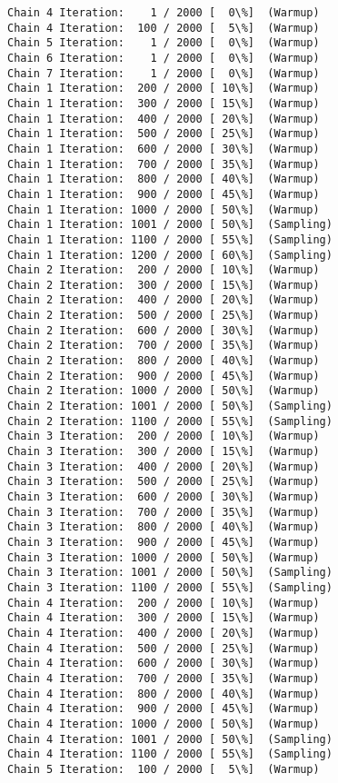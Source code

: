 \documentclass[11pt]{article}
\begin{document}
    \begin{Verbatim}[commandchars=\\\{\}]
Chain 4 Iteration:    1 / 2000 [  0\%]  (Warmup)
Chain 4 Iteration:  100 / 2000 [  5\%]  (Warmup)
Chain 5 Iteration:    1 / 2000 [  0\%]  (Warmup)
Chain 6 Iteration:    1 / 2000 [  0\%]  (Warmup)
Chain 7 Iteration:    1 / 2000 [  0\%]  (Warmup)
Chain 1 Iteration:  200 / 2000 [ 10\%]  (Warmup)
Chain 1 Iteration:  300 / 2000 [ 15\%]  (Warmup)
Chain 1 Iteration:  400 / 2000 [ 20\%]  (Warmup)
Chain 1 Iteration:  500 / 2000 [ 25\%]  (Warmup)
Chain 1 Iteration:  600 / 2000 [ 30\%]  (Warmup)
Chain 1 Iteration:  700 / 2000 [ 35\%]  (Warmup)
Chain 1 Iteration:  800 / 2000 [ 40\%]  (Warmup)
Chain 1 Iteration:  900 / 2000 [ 45\%]  (Warmup)
Chain 1 Iteration: 1000 / 2000 [ 50\%]  (Warmup)
Chain 1 Iteration: 1001 / 2000 [ 50\%]  (Sampling)
Chain 1 Iteration: 1100 / 2000 [ 55\%]  (Sampling)
Chain 1 Iteration: 1200 / 2000 [ 60\%]  (Sampling)
Chain 2 Iteration:  200 / 2000 [ 10\%]  (Warmup)
Chain 2 Iteration:  300 / 2000 [ 15\%]  (Warmup)
Chain 2 Iteration:  400 / 2000 [ 20\%]  (Warmup)
Chain 2 Iteration:  500 / 2000 [ 25\%]  (Warmup)
Chain 2 Iteration:  600 / 2000 [ 30\%]  (Warmup)
Chain 2 Iteration:  700 / 2000 [ 35\%]  (Warmup)
Chain 2 Iteration:  800 / 2000 [ 40\%]  (Warmup)
Chain 2 Iteration:  900 / 2000 [ 45\%]  (Warmup)
Chain 2 Iteration: 1000 / 2000 [ 50\%]  (Warmup)
Chain 2 Iteration: 1001 / 2000 [ 50\%]  (Sampling)
Chain 2 Iteration: 1100 / 2000 [ 55\%]  (Sampling)
Chain 3 Iteration:  200 / 2000 [ 10\%]  (Warmup)
Chain 3 Iteration:  300 / 2000 [ 15\%]  (Warmup)
Chain 3 Iteration:  400 / 2000 [ 20\%]  (Warmup)
Chain 3 Iteration:  500 / 2000 [ 25\%]  (Warmup)
Chain 3 Iteration:  600 / 2000 [ 30\%]  (Warmup)
Chain 3 Iteration:  700 / 2000 [ 35\%]  (Warmup)
Chain 3 Iteration:  800 / 2000 [ 40\%]  (Warmup)
Chain 3 Iteration:  900 / 2000 [ 45\%]  (Warmup)
Chain 3 Iteration: 1000 / 2000 [ 50\%]  (Warmup)
Chain 3 Iteration: 1001 / 2000 [ 50\%]  (Sampling)
Chain 3 Iteration: 1100 / 2000 [ 55\%]  (Sampling)
Chain 4 Iteration:  200 / 2000 [ 10\%]  (Warmup)
Chain 4 Iteration:  300 / 2000 [ 15\%]  (Warmup)
Chain 4 Iteration:  400 / 2000 [ 20\%]  (Warmup)
Chain 4 Iteration:  500 / 2000 [ 25\%]  (Warmup)
Chain 4 Iteration:  600 / 2000 [ 30\%]  (Warmup)
Chain 4 Iteration:  700 / 2000 [ 35\%]  (Warmup)
Chain 4 Iteration:  800 / 2000 [ 40\%]  (Warmup)
Chain 4 Iteration:  900 / 2000 [ 45\%]  (Warmup)
Chain 4 Iteration: 1000 / 2000 [ 50\%]  (Warmup)
Chain 4 Iteration: 1001 / 2000 [ 50\%]  (Sampling)
Chain 4 Iteration: 1100 / 2000 [ 55\%]  (Sampling)
Chain 5 Iteration:  100 / 2000 [  5\%]  (Warmup)

\end{Verbatim}
\end{document}

